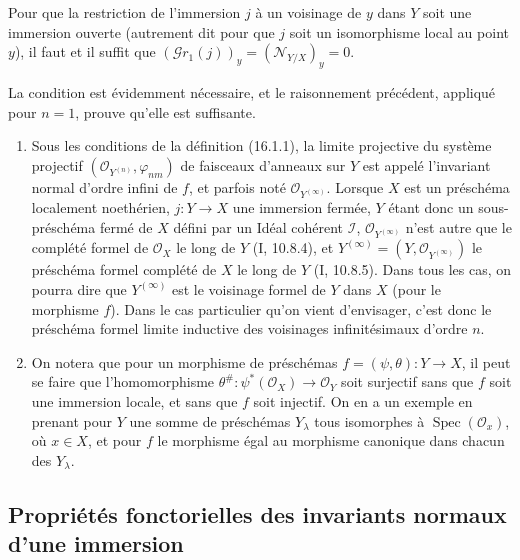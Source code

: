\begin{corollary}[16.1.10]
\label{IV.16.1.10}
Pour que la restriction de l'immersion $j$ à un voisinage de $y$ dans $Y$ soit
une immersion ouverte (autrement dit pour que $j$ soit un isomorphisme local au
point $y$), il faut et il suffit que
$(\mathscr{G}r_1(j))_y=(\mathscr{N}_{Y/X})_y=0$.
\end{corollary}

La condition est évidemment nécessaire, et le raisonnement précédent, appliqué
pour $n=1$, prouve qu'elle est suffisante.

\begin{remarks}[16.1.11]
\label{IV.16.1.11}
\begin{enumerate}
\item[(i)] Sous les conditions de la définition (16.1.1), la limite projective
du système projectif
$(\mathcal{O}_{Y^{(n)}},\varphi_{nm})$ de faisceaux d'anneaux sur $Y$ est
appelé l'invariant normal d'ordre infini de $f$, et parfois noté
$\mathcal{O}_{Y^{(\infty)}}$. Lorsque $X$ est un préschéma localement
noethérien, $j:Y\to X$ une immersion fermée, $Y$ étant donc un sous-préschéma
fermé de $X$ défini par un Idéal cohérent $\mathscr{I}$,
$\mathcal{O}_{Y^{(\infty)}}$ n'est autre que le complété formel de
$\mathcal{O}_X$ le long de $Y$ (I, 10.8.4), et
$Y^{(\infty)}=(Y,\mathcal{O}_{Y^{(\infty)}})$ le préschéma formel complété de
$X$ le long de $Y$ (I, 10.8.5). Dans tous les cas, on pourra dire que
$Y^{(\infty)}$ est le voisinage formel de $Y$ dans $X$ (pour le morphisme
$f$). Dans le cas particulier qu'on vient d'envisager, c'est donc le préschéma
formel limite inductive des voisinages infinitésimaux d'ordre $n$.
\item[(ii)] On notera que pour un morphisme de préschémas
$f=(\psi,\theta):Y\to X$, il peut se faire que l'homomorphisme
$\theta^\#:\psi^*(\mathcal{O}_X)\to\mathcal{O}_Y$ soit surjectif sans que $f$
soit une immersion
locale, et sans que $f$ soit injectif. On en a un exemple en prenant pour $Y$
une somme de préschémas $Y_\lambda$ tous isomorphes à
$\operatorname{Spec}(\mathcal{O}_x)$, où $x\in X$, et pour $f$ le morphisme
égal au morphisme canonique dans chacun des $Y_\lambda$.
\end{enumerate}
\end{remarks}

\subsection{Propriétés fonctorielles des invariants normaux d'une immersion}
\label{IV.16.2}

